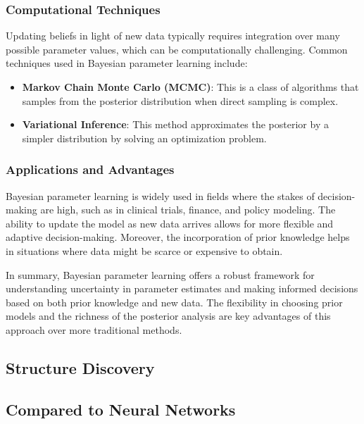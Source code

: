 \subsubsection{Computational Techniques}
Updating beliefs in light of new data typically requires integration over many possible parameter values, which can be computationally challenging. Common techniques used in Bayesian parameter learning include:
\begin{itemize}
    \item \textbf{Markov Chain Monte Carlo (MCMC)}: This is a class of algorithms that samples from the posterior distribution when direct sampling is complex.
    \item \textbf{Variational Inference}: This method approximates the posterior by a simpler distribution by solving an optimization problem.
\end{itemize}

\subsubsection{Applications and Advantages}
Bayesian parameter learning is widely used in fields where the stakes of decision-making are high, such as in clinical trials, finance, and policy modeling. The ability to update the model as new data arrives allows for more flexible and adaptive decision-making. Moreover, the incorporation of prior knowledge helps in situations where data might be scarce or expensive to obtain.

In summary, Bayesian parameter learning offers a robust framework for understanding uncertainty in parameter estimates and making informed decisions based on both prior knowledge and new data. The flexibility in choosing prior models and the richness of the posterior analysis are key advantages of this approach over more traditional methods.

\subsection{Structure Discovery}
\subsection{Compared to Neural Networks}